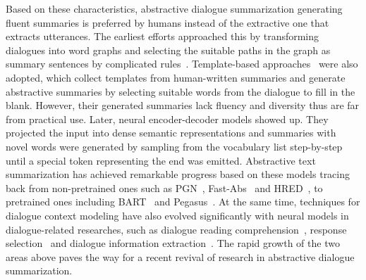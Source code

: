 Based on these characteristics, abstractive dialogue summarization generating fluent summaries is preferred by humans instead of the extractive one that extracts utterances.
The earliest efforts approached this by transforming dialogues into word graphs and selecting the suitable paths in the graph as summary sentences by complicated rules~\cite{banerjee2015generating,shang2018unsupervised}.
Template-based approaches~\cite{OyaMCN14,singla2017spoken} were also adopted, which collect templates from human-written summaries and generate abstractive summaries by selecting suitable words from the dialogue to fill in the blank. However, their generated summaries lack fluency and diversity thus are far from practical use.  
Later, neural encoder-decoder models showed up. They projected the input into dense semantic representations and summaries with novel words were generated by sampling from the vocabulary list step-by-step until a special token representing the end was emitted. Abstractive text summarization has achieved remarkable progress based on these models tracing back from 
non-pretrained ones such as PGN~\cite{see2017get}, Fast-Abs~\cite{chen2018fast} and HRED~\cite{serban2016building}, to pretrained ones including 
BART~\cite{lewis2020bart} and Pegasus~\cite{zhang2020pegasus}. 
At the same time, techniques for dialogue context modeling have also evolved significantly with neural models in dialogue-related researches, such as dialogue reading comprehension~\cite{sun2019dream}, response selection~\cite{xu2020learning} and dialogue information extraction~\cite{yu2020dialogue}.
The rapid growth of the two areas above paves the way for a recent revival of research in abstractive dialogue summarization. 





